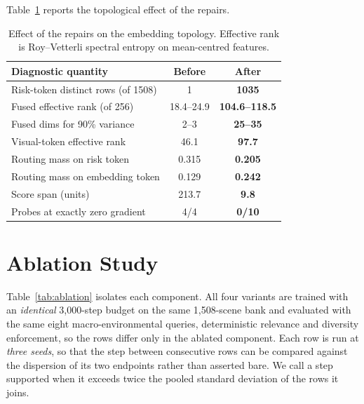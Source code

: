 \documentclass[10pt,twocolumn,letterpaper]{article}
\begin{document}
Table~\ref{tab:repair} reports the topological effect of the repairs.
\begin{table}[t]\centering\footnotesize
\setlength{\tabcolsep}{4pt}
\begin{tabular}{lcc}
\toprule
Diagnostic quantity & Before & After \\
\midrule
Risk-token distinct rows (of 1508) & 1 & \textbf{1035} \\
Fused effective rank (of 256)      & 18.4--24.9 & \textbf{104.6--118.5} \\
Fused dims for 90\% variance       & 2--3 & \textbf{25--35} \\
Visual-token effective rank        & 46.1 & \textbf{97.7} \\
Routing mass on risk token         & 0.315 & \textbf{0.205} \\
Routing mass on embedding token    & 0.129 & \textbf{0.242} \\
Score span (units)                 & 213.7 & \textbf{9.8} \\
Probes at exactly zero gradient    & 4/4 & \textbf{0/10} \\
\bottomrule
\end{tabular}
\caption{Effect of the repairs on the embedding topology. Effective rank
is Roy--Vetterli spectral entropy on mean-centred features.}
\label{tab:repair}
\end{table}

\section{Ablation Study}
\label{sec:ablation}
Table~\ref{tab:ablation} isolates each component. All four variants are
trained with an \emph{identical} 3{,}000-step budget on the same
1{,}508-scene bank and evaluated with the same eight macro-environmental
queries, deterministic relevance and diversity enforcement, so the rows
differ only in the ablated component. Each row is run at \emph{three seeds},
so that the step between consecutive rows can be compared against the
dispersion of its two endpoints rather than asserted bare. We call a step
supported when it exceeds twice the pooled standard deviation of the rows it
joins.
\end{document}

